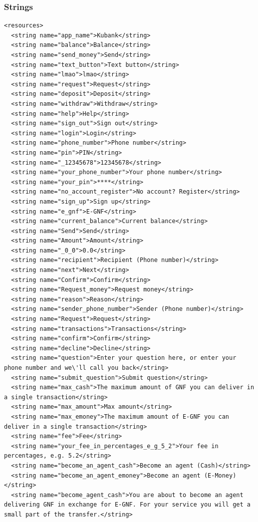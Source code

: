 \documentclass[11pt, a4paper]{article}
\begin{document}
\begin{appendices}
\subsubsection{Strings}
\begin{lstlisting}
<resources>
  <string name="app_name">Kubank</string>
  <string name="balance">Balance</string>
  <string name="send_money">Send</string>
  <string name="text_button">Text button</string>
  <string name="lmao">lmao</string>
  <string name="request">Request</string>
  <string name="deposit">Deposit</string>
  <string name="withdraw">Withdraw</string>
  <string name="help">Help</string>
  <string name="sign_out">Sign out</string>
  <string name="login">Login</string>
  <string name="phone_number">Phone number</string>
  <string name="pin">PIN</string>
  <string name="_12345678">12345678</string>
  <string name="your_phone_number">Your phone number</string>
  <string name="your_pin">****</string>
  <string name="no_account_register">No account? Register</string>
  <string name="sign_up">Sign up</string>
  <string name="e_gnf">E-GNF</string>
  <string name="current_balance">Current balance</string>
  <string name="Send">Send</string>
  <string name="Amount">Amount</string>
  <string name="_0_0">0.0</string>
  <string name="recipient">Recipient (Phone number)</string>
  <string name="next">Next</string>
  <string name="Confirm">Confirm</string>
  <string name="Request_money">Request money</string>
  <string name="reason">Reason</string>
  <string name="sender_phone_number">Sender (Phone number)</string>
  <string name="Request">Request</string>
  <string name="transactions">Transactions</string>
  <string name="confirm">Confirm</string>
  <string name="decline">Decline</string>
  <string name="question">Enter your question here, or enter your phone number and we\'ll call you back</string>
  <string name="submit_question">Submit question</string>
  <string name="max_cash">The maximum amount of GNF you can deliver in a single transaction</string>
  <string name="max_amount">Max amount</string>
  <string name="max_emoney">The maximum amount of E-GNF you can deliver in a single transaction</string>
  <string name="fee">Fee</string>
  <string name="your_fee_in_percentages_e_g_5_2">Your fee in percentages, e.g. 5.2</string>
  <string name="become_an_agent_cash">Become an agent (Cash)</string>
  <string name="become_an_agent_emoney">Become an agent (E-Money)</string>
  <string name="become_agent_cash">You are about to become an agent delivering GNF in exchange for E-GNF. For your service you will get a small part of the transfer.</string>

\end{lstlisting}
\end{appendices}
\end{document}
